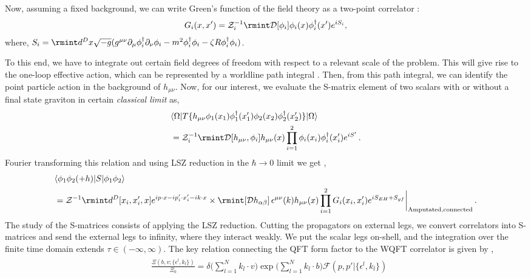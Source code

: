 Now, assuming a fixed background, we can write Green's function of the field theory as a two-point correlator : 
\begin{align}
G_i(x,x')=\mathcal{Z}_i^{-1}\rmint \mathcal{D}[\phi_i]\phi_i(x)\phi_i^{\dagger}(x')e^{i S_i},
\end{align}
where, $S_i=\rmint d^D x \sqrt{-g}(g^{\mu\nu}\partial_\mu\phi_i^{\dagger}\partial_\nu\phi_i-m^2\phi_i^{\dagger}\phi_i-\zeta R\phi_i^{\dagger}\phi_i)$.\par
 To this end, we have to integrate out certain field degrees of freedom with respect to a relevant scale of the problem. This will give rise to the one-loop effective action, which can be represented by a worldline path integral \cite{Strassler:1992zr,Feal:2022iyn,Ahmadiniaz:2022yam}. Then, from this path integral, we can identify the point particle action in the background of $h_{\mu\nu}$.
Now, for our interest, we evaluate the S-matrix element of two scalars with or without a final state graviton in certain \textit{classical limit} as,
\begin{align}
&\langle \Omega|T\{h_{\mu\nu}\phi_1(x_1)\phi_1^{\dagger}(x_1')\phi_2(x_2)\phi_2^{\dagger}(x_2')\}|\Omega\rangle\\&
=\mathcal{Z}_i^{-1}\rmint \mathcal{D}[h_{\mu\nu},\phi_i]h_{\mu\nu}(x)\prod_{i=1}^2\phi_i(x_i)\phi_i^{\dagger}(x_i')e^{i S'}\,.
\end{align}
Fourier transforming this relation and using LSZ reduction in the $\hbar \rightarrow 0 $ limit we get \cite{Mogull:2020sak},
\begin{align}&\langle \phi_1\phi_2(+h)|S|\phi_1\phi_2\rangle\\&
=\mathcal{Z}^{-1}\rmint d^D[x_i,x_i',x]e^{ip\cdot x-ip_i'\cdot x_i'-ik\cdot x}\times \rmint [\mathcal{D}h_{\alpha\beta}]\,\epsilon^{\mu\nu}(k)h_{\mu\nu}(x)\prod_{i=1}^2 G_i(x_i,x_i')e^{i S_{EH}+S_{gf}}\bigg{|}_{\textrm{Amputated,connected}}\,.
\end{align}
The study of the S-matrices consists of applying the LSZ reduction. Cutting the propagators on external legs, we convert correlators into S-matrices and send the external legs to infinity, where they interact weakly. We put the scalar legs on-shell, and the integration over the finite time domain extends $\tau \in (-\infty, \infty)$.
The key relation connecting the QFT form factor to the WQFT correlator is given by \cite{Mogull:2020sak},
\begin{align}
\begin{split}
&\frac{\Xi(b,v;\{\epsilon^{l},k_{l}\})}{\Xi_0}=\delta\Bigg(\sum_{l=1}^N k_l\cdot v\Bigg) \exp\Big({\sum_{l=1}^N k_l\cdot b} \Big)\mathcal{F}(p,p'|\{\epsilon^{l},k_{l}\})
\end{split}
\end{align}
\newcommand{\chthreeinlinefeynwidth}{0.13\linewidth}
\newcommand{\chthreeleadfeynwidth}{0.32\linewidth}


